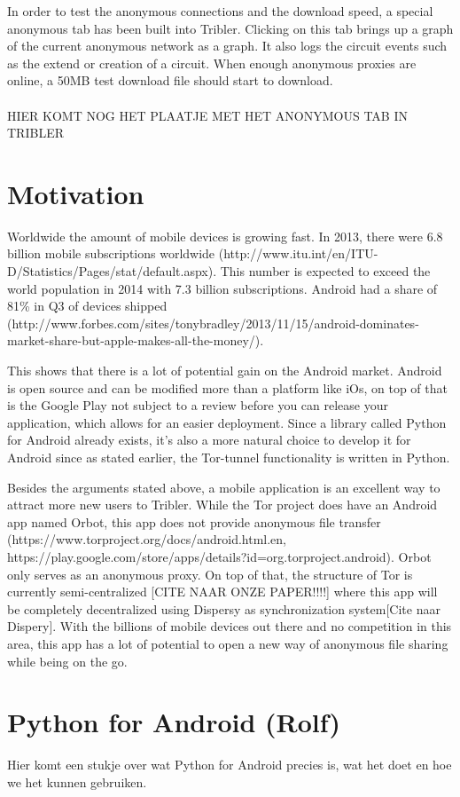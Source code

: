 \documentclass[11pt]{article}
\begin{document}
In order to test the anonymous connections and the download speed, a special anonymous tab has been built into Tribler. Clicking on this tab brings up a graph of the current anonymous network as a graph. It also logs the circuit events such as the extend or creation of a circuit. When enough anonymous proxies are online, a 50MB test download file should start to download.\\\\
HIER KOMT NOG HET PLAATJE MET HET ANONYMOUS TAB IN TRIBLER

\section{Motivation}
Worldwide the amount of mobile devices is growing fast. In 2013, there were 6.8 billion mobile subscriptions worldwide (http://www.itu.int/en/ITU-D/Statistics/Pages/stat/default.aspx). This number is expected to exceed the world population in 2014 with 7.3 billion subscriptions. Android had a share of 81\% in Q3 of devices shipped (http://www.forbes.com/sites/tonybradley/2013/11/15/android-dominates-market-share-but-apple-makes-all-the-money/).

This shows that there is a lot of potential gain on the Android market. Android is open source and can be modified more than a platform like iOs, on top of that is the Google Play not subject to a review before you can release your application, which allows for an easier deployment. Since a library called Python for Android already exists, it's also a more natural choice to develop it for Android since as stated earlier, the Tor-tunnel functionality is written in Python.

Besides the arguments stated above, a mobile application is an excellent way to attract more new users to Tribler. While the Tor project does have an Android app named Orbot, this app does not provide anonymous file transfer (https://www.torproject.org/docs/android.html.en, https://play.google.com/store/apps/details?id=org.torproject.android). Orbot only serves as an anonymous proxy. On top of that, the structure of Tor is currently semi-centralized [CITE NAAR ONZE PAPER!!!!] where this app will be completely decentralized using Dispersy as synchronization system[Cite naar Dispery]. With the billions of mobile devices out there and no competition in this area, this app has a lot of potential to open a new way of anonymous file sharing while being on the go.

\section{Python for Android (Rolf)}
Hier komt een stukje over wat Python for Android precies is, wat het doet en hoe we het kunnen gebruiken.
\end{document}
